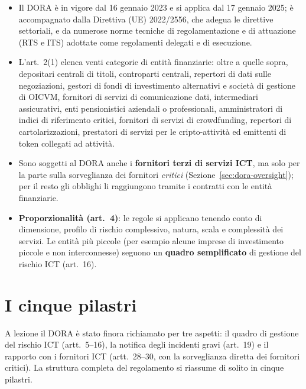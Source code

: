 \begin{integrazione}
\begin{itemize}
  \item Il DORA è in vigore dal 16 gennaio 2023 e si applica dal 17 gennaio 2025; è accompagnato dalla
    Direttiva (UE) 2022/2556, che adegua le direttive settoriali, e da numerose norme tecniche di
    regolamentazione e di attuazione (RTS e ITS) adottate come regolamenti delegati e di esecuzione.
  \item L'art.~2(1) elenca venti categorie di entità finanziarie: oltre a quelle sopra, depositari
    centrali di titoli, controparti centrali, repertori di dati sulle negoziazioni, gestori di fondi di
    investimento alternativi e società di gestione di OICVM, fornitori di servizi di comunicazione dati,
    intermediari assicurativi, enti pensionistici aziendali o professionali, amministratori di indici
    di riferimento critici, fornitori di servizi di crowdfunding, repertori di cartolarizzazioni,
    prestatori di servizi per le cripto-attività ed emittenti di token collegati ad attività.
  \item Sono soggetti al DORA anche i \textbf{fornitori terzi di servizi ICT}, ma solo per la parte
    sulla sorveglianza dei fornitori \emph{critici} (Sezione~\ref{sec:dora-oversight}); per il resto
    gli obblighi li raggiungono tramite i contratti con le entità finanziarie.
  \item \textbf{Proporzionalità (art.~4)}: le regole si applicano tenendo conto di dimensione, profilo
    di rischio complessivo, natura, scala e complessità dei servizi. Le entità più piccole (per esempio
    alcune imprese di investimento piccole e non interconnesse) seguono un \textbf{quadro semplificato}
    di gestione del rischio ICT (art.~16).
\end{itemize}
\end{integrazione}

\section{I cinque pilastri}
\label{sec:dora-pilastri}

A lezione il DORA è stato finora richiamato per tre aspetti: il quadro di gestione del rischio ICT
(artt.~5--16), la notifica degli incidenti gravi (art.~19) e il rapporto con i fornitori ICT
(artt.~28--30, con la sorveglianza diretta dei fornitori critici). La struttura completa del
regolamento si riassume di solito in cinque pilastri.


